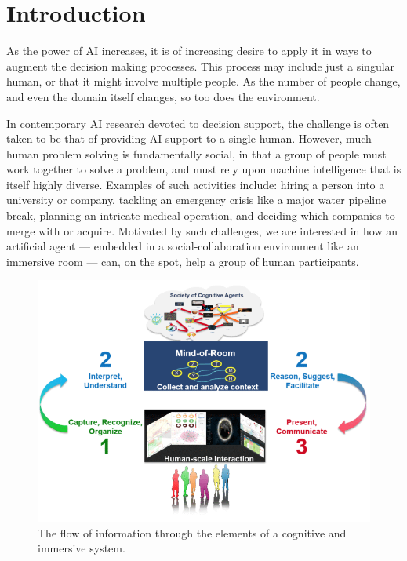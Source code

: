 \section{Introduction}


As the power of AI increases, it is of increasing desire to apply
it in ways to augment the decision making processes. This process
may include just a singular human, or that it might involve
multiple people. As the number of people change, and even the
domain itself changes, so too does the environment.

In contemporary AI research devoted to decision support, the challenge
is often taken to be that of providing AI support to a single human.
However, much human problem solving
is fundamentally social, in that a group of people must work together
to solve a problem, and must rely upon machine intelligence that is
itself highly diverse.  Examples of such activities include: hiring a
person into a university or company, tackling an emergency crisis like
a major water pipeline break, planning an intricate medical operation,
and deciding which companies to merge with or acquire.  Motivated by
such challenges, we are interested in how an artificial agent ---
embedded in a social-collaboration environment like an immersive room
--- can, on the spot, help a group of human participants.

\begin{figure}
\centering
\includegraphics[width=0.5\columnwidth]{chapters/01_introduction/figures/cisl-cycle-graphic.png}
\caption{The flow of information through the elements of a cognitive and immersive system.}
\label{fig:cycle-cais}
\end{figure}

